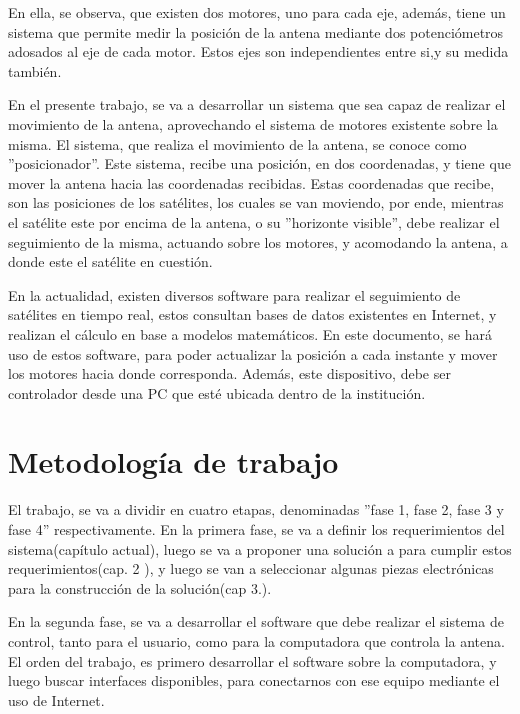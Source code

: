 En ella, se observa, que existen dos motores, uno para cada eje, además, tiene un sistema que permite medir la posición de la antena mediante dos potenciómetros adosados al eje de cada motor. Estos ejes son independientes entre si,y su medida también. 



En el presente trabajo, se va a desarrollar un sistema que sea capaz de realizar el movimiento de la antena, aprovechando el sistema de motores existente sobre la misma. El sistema, que realiza el movimiento de la antena, se conoce como ''posicionador''. Este sistema, recibe una posición, en dos coordenadas, y tiene que mover la antena hacia las coordenadas recibidas. Estas coordenadas que recibe, son las posiciones de los satélites, los cuales se van moviendo, por ende, mientras el satélite este por encima de la antena, o su ''horizonte visible'', debe realizar el seguimiento de la misma, actuando sobre los motores, y acomodando la antena, a donde este el satélite en cuestión.

En la actualidad, existen diversos software para realizar el seguimiento de satélites en tiempo real, estos consultan bases de datos existentes en Internet, y realizan el cálculo en base a modelos matemáticos. En este documento, se hará uso de estos software, para poder actualizar la posición a cada instante y mover los motores hacia donde corresponda. Además, este dispositivo, debe ser controlador desde una PC que esté ubicada dentro de la institución. 

\section{Metodología de trabajo}

El trabajo, se va a dividir en cuatro etapas, denominadas ''fase 1, fase 2, fase 3 y fase 4'' respectivamente. En la primera fase, se va a definir los requerimientos del sistema(capítulo actual), luego se va a proponer una solución a para cumplir estos requerimientos(cap. 2 ), y luego se van a seleccionar algunas piezas electrónicas para la construcción de la solución(cap 3.). 

En la segunda fase, se va a desarrollar el software que debe realizar el sistema de control, tanto para el usuario, como para la computadora que controla la antena. El orden del trabajo, es primero desarrollar el software sobre la computadora, y luego buscar interfaces disponibles, para conectarnos con ese equipo mediante el uso de Internet. 



